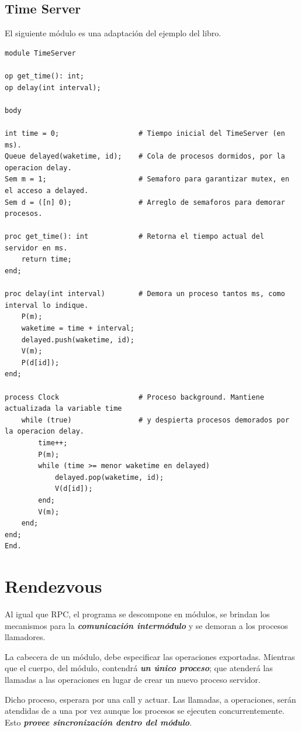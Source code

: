 \documentclass[a4paper, 10pt]{report}
\begin{document}
\subsection{Time Server}

El siguiente módulo es una adaptación del ejemplo del libro.

\begin{lstlisting}
module TimeServer

op get_time(): int;
op delay(int interval);

body

int time = 0;                   # Tiempo inicial del TimeServer (en ms).
Queue delayed(waketime, id);    # Cola de procesos dormidos, por la operacion delay.
Sem m = 1;                      # Semaforo para garantizar mutex, en el acceso a delayed.
Sem d = ([n] 0);                # Arreglo de semaforos para demorar procesos.

proc get_time(): int            # Retorna el tiempo actual del servidor en ms.
	return time;
end;

proc delay(int interval)        # Demora un proceso tantos ms, como interval lo indique.
	P(m);
	waketime = time + interval;
	delayed.push(waketime, id);
	V(m);
	P(d[id]);
end;

process Clock                   # Proceso background. Mantiene actualizada la variable time
	while (true)                # y despierta procesos demorados por la operacion delay.
		time++;                 
		P(m);
		while (time >= menor waketime en delayed)
			delayed.pop(waketime, id);
			V(d[id]);
		end;
		V(m);
	end;
end;
End.
\end{lstlisting}

\section{Rendezvous}

Al igual que RPC, el programa se descompone en módulos, se brindan los mecanismos para la \textbf{\emph{comunicación intermódulo}} y se demoran a los procesos llamadores.

La cabecera de un módulo, debe especificar las operaciones exportadas. Mientras que el cuerpo, del módulo, contendrá \textbf{\emph{un único proceso}}; que atenderá las llamadas a las operaciones en lugar de crear un nuevo proceso servidor.

Dicho proceso, esperara por una call y actuar. Las llamadas, a operaciones, serán atendidas de a una por vez aunque los procesos se ejecuten concurrentemente. Esto \textbf{\emph{provee sincronización dentro del módulo}}.
\end{document}
